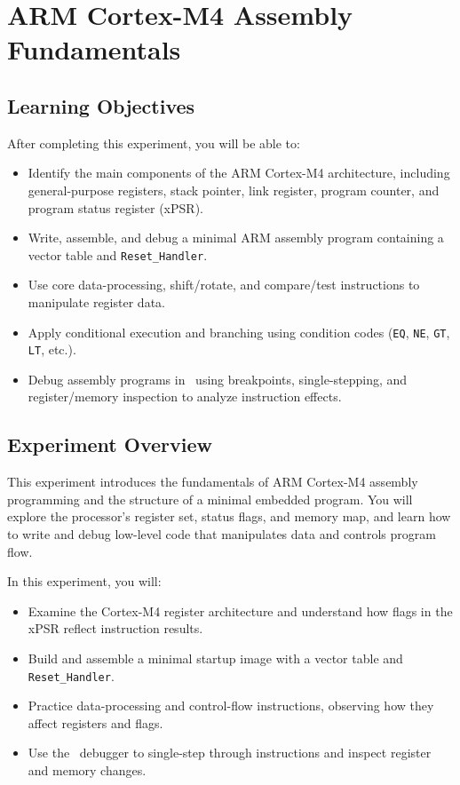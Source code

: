 \chapter{ARM Cortex-M4 Assembly Fundamentals}
\section*{Learning Objectives}
After completing this experiment, you will be able to:
\begin{itemize}[nosep]
  \item Identify the main components of the ARM Cortex-M4 architecture, including general-purpose registers, stack pointer, link register, program counter, and program status register (xPSR).
  \item Write, assemble, and debug a minimal ARM assembly program containing a vector table and \texttt{Reset\_Handler}.
  \item Use core data-processing, shift/rotate, and compare/test instructions to manipulate register data.
  \item Apply conditional execution and branching using condition codes (\texttt{EQ}, \texttt{NE}, \texttt{GT}, \texttt{LT}, etc.).
  \item Debug assembly programs in \keil\ using breakpoints, single-stepping, and register/memory inspection to analyze instruction effects.
\end{itemize}

\section*{Experiment Overview}
This experiment introduces the fundamentals of ARM Cortex-M4 assembly programming and the structure of a minimal embedded program. 
You will explore the processor's register set, status flags, and memory map, and learn how to write and debug low-level code that manipulates data and controls program flow.

\noindent In this experiment, you will:
\begin{itemize}[nosep]
  \item Examine the Cortex-M4 register architecture and understand how flags in the xPSR reflect instruction results.
  \item Build and assemble a minimal startup image with a vector table and \texttt{Reset\_Handler}.
  \item Practice data-processing and control-flow instructions, observing how they affect registers and flags.
  \item Use the \keil\ debugger to single-step through instructions and inspect register and memory changes.
\end{itemize}

